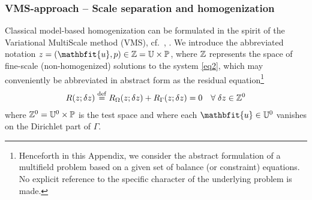 \documentclass[12pt,a4paper]{article}
\renewcommand{\ta}[1]{\mathbfit{#1}}
\begin{document}
\subsubsection{VMS-approach -- Scale separation and homogenization}

Classical model-based homogenization can be formulated in the spirit of the Variational MultiScale method (VMS), cf.\ \cite{Hughesetal1998}, \cite{LarsonMalqvist2007}.
We introduce the abbreviated notation $z = (\ta u, p) \in \set{Z} = \set U \times \set P$, where $\mathbb{Z}$ represents the space of fine-scale (non-homogenized) solutions to the system \cref{eq2},
which may conveniently be abbreviated in abstract form as the residual equation\footnote{Henceforth in this Appendix, we consider the abstract formulation of a multifield problem based on a given set of balance (or constraint) equations.
No explicit reference to the specific character of the underlying problem is made.}
\begin{align}
 R(z; \delta z) \overset{\mathrm{def}}{=} R_\Omega(z; \delta z) + R_\Gamma(z;\delta z) = 0\quad \forall\;\delta z\in \mathbb{Z}^0
\label{eq:A1}
\end{align}
where $\mathbb{Z}^0 = \mathbb{U}^0 \times \mathbb{P}$ is the test space and where each $\ta u\in \set U^0$ vanishes on the Dirichlet part of $\Gamma$.
\end{document}
